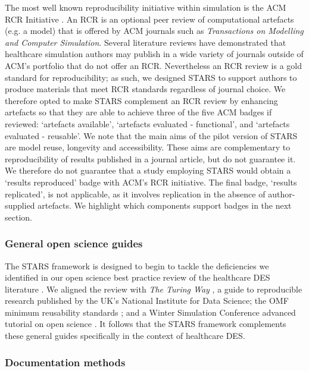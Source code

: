 \documentclass[]{interact}
\theoremstyle{plain}%
\theoremstyle{definition}
\theoremstyle{remark}
\begin{document}
The most well known reproducibility initiative within simulation is the ACM RCR  Initiative \citep{ACM_ArtifactReview}.  An RCR is an optional peer review of computational artefacts (e.g. a model) that is offered by ACM journals such as \textit{Transactions on Modelling and Computer Simulation}. Several literature reviews have demonstrated that healthcare simulation authors may publish in a wide variety of journals outside of ACM's portfolio \citep{VazquezSerrano2021, zhang_application_2018, monks2023computer} that do not offer an RCR. Nevertheless an RCR review is a gold standard for reproducibility; as such, we designed STARS to support authors to produce materials that meet RCR standards regardless of journal choice. We therefore opted to make STARS complement an RCR review by enhancing artefacts so that they are able to achieve three of the five ACM badges if reviewed: `artefacts available', `artefacts evaluated - functional', and `artefacts evaluated - reusable'.  We note that the main aims of the pilot version of STARS are model reuse, longevity and accessibility. These aims are complementary to reproducibility of results published in a journal article, but do not guarantee it.  We therefore do not guarantee that a study employing STARS would obtain a `results reproduced' badge with ACM's RCR initiative. The final badge, `results replicated', is not applicable, as it involves replication in the absence of author-supplied artefacts.  We highlight which components support badges in the next section.

\subsubsection{General open science guides}

The STARS framework is designed to begin to tackle the deficiencies we identified in our open science best practice review of the healthcare DES literature \citep{monks2023computer}. We aligned the review with \textit{The Turing Way }\citep{the_turing_way_community_2022_7470333}, a guide to reproducible research published by the UK’s National Institute for Data Science; the OMF minimum reusability standards \citep{omf}; and a Winter Simulation Conference advanced tutorial on open science \citep{taylor2017open}. It follows that the STARS framework complements these general guides specifically in the context of healthcare DES. 

\subsubsection{Documentation methods}
\end{document}
